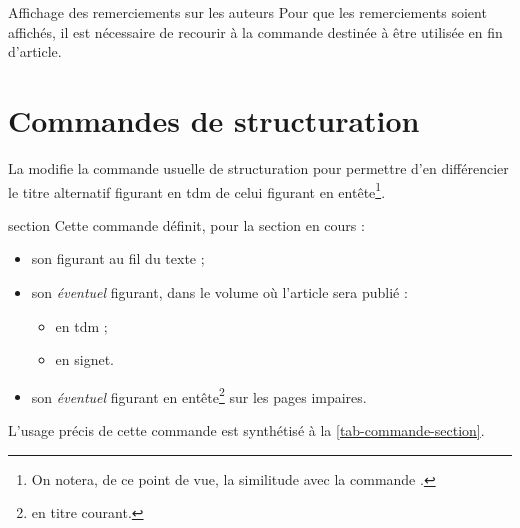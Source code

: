 \documentclass[french,nolocaltoc]{nwejmart}
\newtheorem[style=definition]{fait}
\newtheorem[title=expérience]{experience}
\newtheorem[title-plural=anneaux]{anneau}
\newtheorem[title=idéal,title-plural=idéaux]{ideal}
\begin{document}
\begin{bodycode}[listing options={deletekeywords={[2]first}}]
\end{bodycode}

\begin{dbremark}{Affichage des remerciements sur les auteurs}{}
  Pour que les remerciements soient affichés, il est nécessaire de recourir à la
  commande  destinée à être utilisée en fin d'article.
\end{dbremark}

\section{Commandes de structuration}

La \nwejmauthorcl{} modifie la commande usuelle de structuration
 pour permettre d'en différencier le titre alternatif
figurant en \gls{tdm} de celui figurant en entête\footnote{On notera, de ce
  point de vue, la similitude avec la commande \protect{}.}.

\begin{docCommand}[doc new=2017-10-23]{section}{}
  Cette commande définit, pour la section en cours :
  \begin{itemize}
  \item son  figurant au fil du texte ;
  \item son \emph{éventuel}  figurant, dans le volume où
    l'article sera publié :
    \begin{itemize}
    \item en \gls{tdm} ;
    \item en signet.
    \end{itemize}
  \item son \emph{éventuel}  figurant en
    entête\footnote{\Ie{} en titre courant.} sur les pages impaires.
  \end{itemize}
  L'usage précis de cette commande est synthétisé à la
  \vref{tab-commande-section}.
\end{docCommand}
\end{document}
